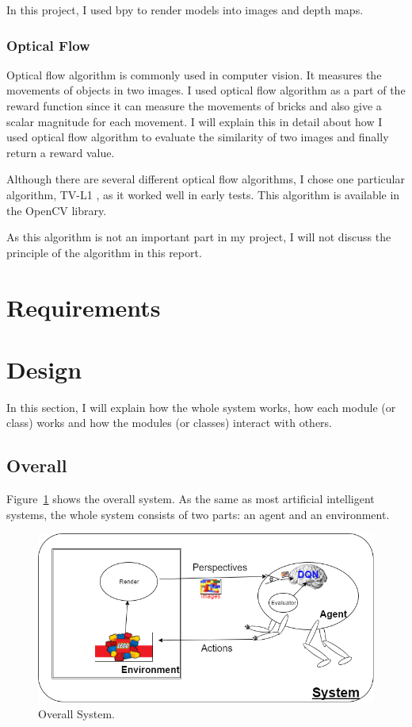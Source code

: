 \documentclass[a4paper]{article}
\begin{document}
                In this project, I used bpy to render models into images and depth maps.
            
            \subsubsection{Optical Flow}
                Optical flow algorithm is commonly used in computer vision. It measures the movements of objects in two images. I used optical flow algorithm as a part of the reward function since it can measure the movements of bricks and also give a scalar magnitude for each movement. I will explain this in detail about how I used optical flow algorithm to evaluate the similarity of two images and finally return a reward value.
                
                Although there are several different optical flow algorithms, I chose one particular algorithm, TV-L1 \cite{tvl1}, as it worked well in early tests. This algorithm is available in the OpenCV library.
                
                As this algorithm is not an important part in my project, I will not discuss the principle of the algorithm in this report.
            
    \section{Requirements}
        
    \section{Design}
    
        In this section, I will explain how the whole system works, how each module (or class) works and how the modules (or classes) interact with others.
    
        \subsection{Overall}
        
            Figure~\ref{fig:system1} shows the overall system. As the same as most artificial intelligent systems, the whole system consists of two parts: an agent and an environment. 
            \begin{figure}[h]
                \centering
                \includegraphics[width=\textwidth]{agent_env.png}
                \caption{\label{fig:system1}Overall System.}
            \end{figure}
            
\end{document}
